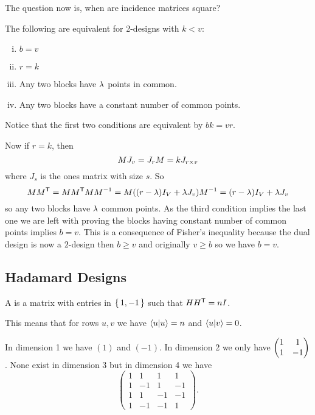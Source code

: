 \documentclass[12pt]{memoir}
\begin{document}
The question now is, when are incidence matrices square?

\begin{Th}
    The following are equivalent for 2-designs with $k<v$:
    \begin{enumerate}[i)]
        \itemsep=-0.4em
        \item $b=v$
        \item $r=k$
        \item Any two blocks have $\lambda$ points in common.
        \item Any two blocks have a constant number of common points.
    \end{enumerate}
\end{Th}

\begin{ptcbp}
    Notice that the first two conditions are equivalent by $bk=vr$.\par 
    Now if $r=k$, then 
    $$MJ_v=J_rM=kJ_{r\times v}$$
    where $J_s$ is the ones matrix with size $s$. So 
    $$MM^{\mathsf{T}}=MM^{\mathsf{T}} MM^{-1}=M((r-\lambda)I_V+\lambda J_v)M^{-1}=(r-\lambda)I_V+\lambda J_v$$
    so any two blocks have $\lambda$ common points. As the third condition implies the last one we are left with proving the blocks having constant number of common points implies $b=v$. This is a consequence of Fisher's inequality because the dual design is now a $2$-design then $b\geq v$ and originally $v\geq b$ so we have $b=v$.
\end{ptcbp}

\subsection{Hadamard Designs}

\begin{Def}
    A  is a matrix with entries in $\{\,1,-1\,\}$ such that $HH^{\mathsf{T}}=nI$. 
\end{Def}
This means that for rows $u,v$ we have $\braket{u}{u}=n$ and $\braket{u}{v}=0$. 

\begin{Ex}
    In dimension 1 we have $(1)$ and $(-1)$. In dimension 2 we only have $\begin{pmatrix} 1 & 1 \\ 1 & -1 \end{pmatrix}$. None exist in dimension 3 but in dimension 4 we have 
    $$\begin{pmatrix}
        1&1&1&1\\1&-1&1&-1\\1&1&-1&-1\\1&-1&-1&1
    \end{pmatrix}.$$
\end{Ex}
\end{document}
